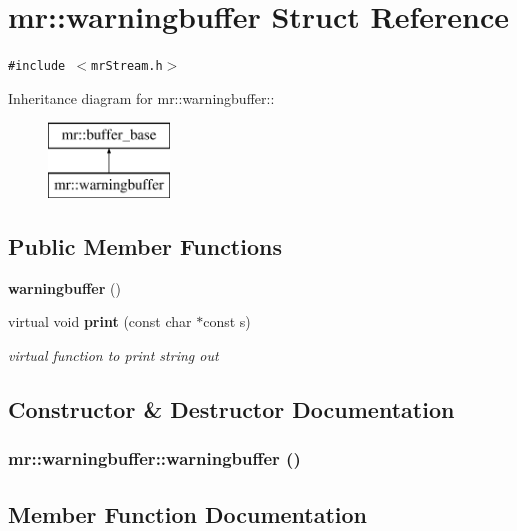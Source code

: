 \section{mr::warningbuffer Struct Reference}
\label{structmr_1_1warningbuffer}
{\tt \#include $<$mr\-Stream.h$>$}

Inheritance diagram for mr::warningbuffer::\begin{figure}[H]
\begin{center}
\leavevmode
\includegraphics[height=2cm]{structmr_1_1warningbuffer}
\end{center}
\end{figure}
\subsection*{Public Member Functions}
\begin{CompactItemize}
\item 
{\bf warningbuffer} ()
\item 
virtual void {\bf print} (const char $\ast$const s)
\begin{CompactList}\small\item\em virtual function to print string out \item\end{CompactList}\end{CompactItemize}


\subsection{Constructor \& Destructor Documentation}
\subsubsection{\setlength{\rightskip}{0pt plus 5cm}mr::warningbuffer::warningbuffer ()\hspace{0.3cm}{\tt  [inline]}}\label{structmr_1_1warningbuffer_a0}




\subsection{Member Function Documentation}
